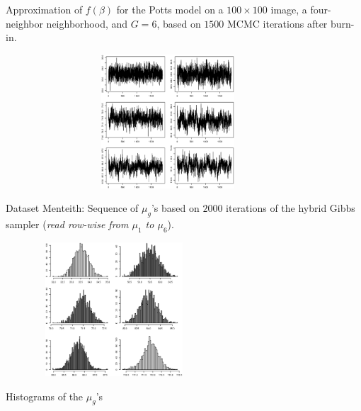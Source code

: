 \begin{slide}
\footnotesize Approximation of $f(\beta)$ for the Potts model on
a $100\times 100$ image, a four-neighbor neighborhood, and $G=6$, based
on $1500$ MCMC iterations after burn-in.

\end{slide}\begin{slide}

\begin{figure}[p!]
\begin{center}
\includegraphics[width=10cm,height=5cm]{figures/mut.eps}
\end{center}
\end{figure}

\footnotesize Dataset {\sf Menteith}: Sequence of $\mu_g$'s based on $2000$ iterations of the hybrid Gibbs sampler ({\em read
row-wise from $\mu_1$ to $\mu_6$}).

\end{slide}\begin{slide}

\begin{figure}[p!]
\begin{center}
\includegraphics[width=6cm,height=5cm]{figures/muh.eps}
\end{center}
\end{figure}

\footnotesize Histograms of the $\mu_g$'s

\end{slide}\begin{slide}


\end{slide}
